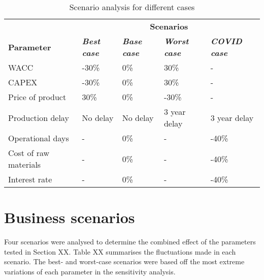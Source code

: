 \begin{table}[H]
\centering
\caption{Scenario analysis for different cases}
\label{scenario_analysis}
\begin{tabular}{lllll}
\rowcolor[HTML]{D2F3FA} 
                      & \multicolumn{4}{c}{\cellcolor[HTML]{D2F3FA}\textbf{Scenarios}}                                                          \\
\rowcolor[HTML]{D2F3FA} 
\textbf{Parameter}    & \textit{\textbf{Best case}} & \textit{\textbf{Base case}} & \textit{\textbf{Worst case}} & \textit{\textbf{COVID case}} \\
WACC                  & -30\%                       & 0\%                         & 30\%                         & -                            \\
CAPEX                 & -30\%                       & 0\%                         & 30\%                         & -                            \\
Price of product      & 30\%                        & 0\%                         & -30\%                        & -                            \\
Production delay      & No delay                    & No delay                    & 3 year delay                 & 3 year delay                 \\
Operational days      & -                           & 0\%                         & -                            & -40\%                        \\
Cost of raw materials & -                           & 0\%                         & -                            & -40\%                        \\
Interest rate         & -                           & 0\%                         & -                            & -40\%                       
\end{tabular}
\end{table}

\section{Business scenarios}
Four scenarios were analysed to determine the combined effect of the parameters tested in Section XX. Table XX summarises the fluctuations made in each scenario. The best- and worst-case scenarios were based off the most extreme variations of each parameter in the sensitivity analysis. 

